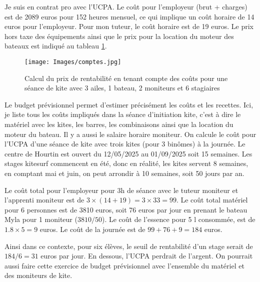 \documentclass[11pt,a4paper]{report}
\begin{document}
Je suis en contrat pro avec l'UCPA. Le coût pour
l'employeur (brut + charges) est de 2089 euros pour 152 heures mensuel, 
ce qui implique un coût horaire de 14 euros pour l'employeur.
Pour mon tuteur, le coût horaire est de 19 euros. Le prix hors taxe
des équipements ainsi que le prix pour la location du moteur des
bateaux est indiqué au tableau \ref{couts}.

\begin{figure}
\texttt{[image: Images/comptes.jpg]} 
\caption{Calcul du prix de rentabilité en tenant compte
des co\^uts  pour une séance de kite
avec 3 ailes, 1 bateau, 2 moniteurs et 6 stagiaires\label{couts}}
\end{figure}

Le budget prévisionnel permet d'estimer précisément les co\^uts et les recettes.
Ici, je liste tous les coûts impliqués dans la séance d’initiation kite, 
c'est  à dire le matériel avec les kites, les barres, les 
combinaisons ainsi que la location du moteur du bateau. 
Il y a aussi le salaire horaire moniteur. On calcule le coût pour l'UCPA
d'une séance de kite avec trois kites (pour 3 binômes) à la journée.
Le centre de Hourtin est ouvert du 12/05/2025 au 01/09/2025 soit 15 semaines. 
Les stages kitesurf commencent en été, donc en réalité, les kites servent
8 semaines, en comptant mai et juin, on peut arrondir à 10 semaines,
soit 50 jours par an.

Le coût total pour l'employeur pour 3h de séance avec le tuteur moniteur
et l'apprenti moniteur est de $3\times(14+19) = 3\times33 = 99 $.
Le coût total matériel pour 6 personnes est de 3810 euros, soit 76 euros
par jour  en prenant le bateau Myla pour 1 moniteur ($3810/50$).
Le coût de l'essence pour 5 l consommée, est de $1.8\times5 = 9$ euros.
Le coût de la journée est de $99 + 76 + 9 =  184 $ euros.

Ainsi dans ce contexte,  pour six élèves, le seuil de rentabilité
d'un stage serait de $184/6 = 31$ euros
par jour. En dessous, l'UCPA perdrait de l'argent.
On pourrait aussi faire cette exercice de budget prévisionnel avec
l'ensemble du matériel et des moniteurs de kite.

\end{document}
